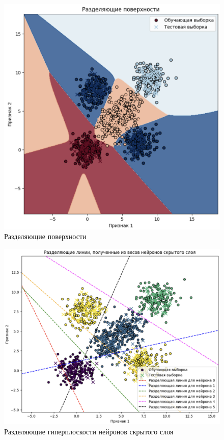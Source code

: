 \begin{figure}
	\begin{center}
		\includegraphics[width=\textwidth]{images/16.png}
	\end{center}
	\caption{Разделяющие поверхности}
	\label{img:16}
\end{figure}

\begin{figure}
	\begin{center}
		\includegraphics[width=\textwidth]{images/17.png}
	\end{center}
	\caption{Разделяющие гиперплоскости нейронов скрытого слоя}
	\label{img:17}
\end{figure}

